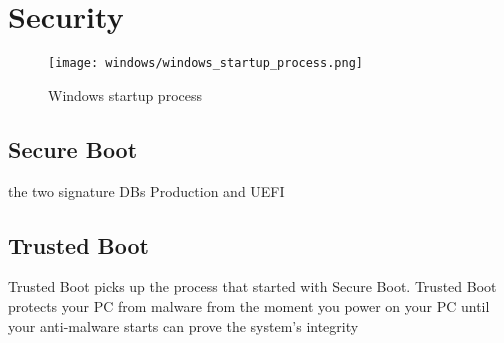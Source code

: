 
\section{Security}


\begin{figure}[htb]
    \centering
    \texttt{[image: windows/windows\_startup\_process.png]}
    \caption{Windows startup process \cite{microsoft-secure-the-windows-boot-process}}
    \label{fig:windows-startup-process}
\end{figure}

\subsection{Secure Boot}





\cite{microsoft-secure-the-windows-boot-process}

the two signature \acp{DB} Production and UEFI


\subsection{Trusted Boot}
Trusted Boot picks up the process that started with Secure Boot.
Trusted Boot protects your PC from malware from the moment you power on your PC until your anti-malware starts
can prove the system's integrity

